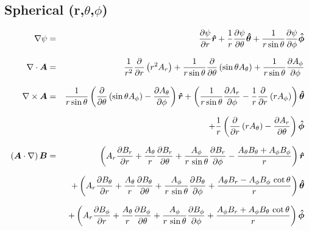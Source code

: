 
~~~~
\bigskip
\subsection{Spherical (r,$\theta$,$\phi$)}

\begin{eqnarray}
\nabla \psi &=& \frac{\partial \psi}{\partial r}\urr + \frac{1}{r}\frac{\partial\psi}{\partial \theta}\ut 
              + \frac{1}{r \st}\frac{\partial\psi}{\partial \phi}\up \nonumnext
\nabla \cdot \vA &=& \frac{1}{r^{2}}\frac{\partial}{\partial r}\left( r^{2} A_{r} \right) 
                   + \frac{1}{r \st}\frac{\partial}{\partial \theta}\left( \st A_{\theta} \right) 
                   + \frac{1}{r \st}\frac{\partial A_{\phi}}{\partial \phi} \nonumnext
\nabla \times \vA &=& \frac{1}{r \st}\left( \frac{\partial}{\partial \theta}\left( \st A_{\phi} \right) 
                      - \frac{\partial A_{\theta}}{\partial \phi} \right)\urr
                    + \left( \frac{1}{r \st}\frac{\partial A_{r}}{\partial \phi} 
                      - \frac{1}{r}\frac{\partial}{\partial r}\left( r A_{\phi} \right) \right)\ut \nonumnext
                  &&+ \frac{1}{r}\left( \frac{\partial}{\partial r}\left( r A_{\theta} \right)  
                      - \frac{\partial A_{r}}{\partial \theta} \right)\up \nonumnext
(\vA \cdot \nabla)\, \vB &=& \left( A_{r}\frac{\partial B_{r}}{\partial r} 
                                + \frac{A_{\theta}}{r}\frac{\partial B_{r}}{\partial \theta} 
                                + \frac{A_{\phi}}{r\,\sin{\theta}}\frac{\partial B_{r}}{\partial \phi} 
                                - \frac{A_{\theta}B_{\theta}+A_{\phi}B_{\phi}}{r} \right) \urr \nonumnext
                          &&+\left( A_{r}\frac{\partial B_{\theta}}{\partial r} 
                                + \frac{A_{\theta}}{r}\frac{\partial B_{\theta}}{\partial \theta} 
                                + \frac{A_{\phi}}{r\,\sin{\theta}}\frac{\partial B_{\theta}}{\partial \phi} 
                                + \frac{A_{\theta}B_{r} - A_{\phi}B_{\phi}\,\cot{\theta}}{r} \right) \ut \nonumnext
                          &&+\left( A_{r}\frac{\partial B_{\phi}}{\partial r} 
                                + \frac{A_{\theta}}{r}\frac{\partial B_{\phi}}{\partial \theta} 
                                + \frac{A_{\phi}}{r\,\sin{\theta}}\frac{\partial B_{\phi}}{\partial \phi} 
                                + \frac{A_{\phi}B_{r} + A_{\phi}B_{\theta}\,\cot{\theta}}{r} \right) \up \nonumnext

\end{eqnarray}

